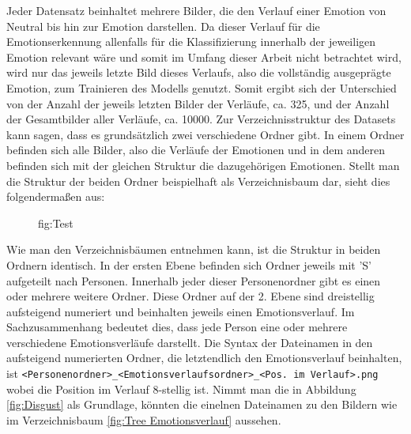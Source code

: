\documentclass[12pt, a4paper]{report}
\begin{document}
Jeder Datensatz beinhaltet mehrere Bilder, die den Verlauf einer Emotion von Neutral bis hin zur Emotion darstellen. Da dieser Verlauf für die Emotionserkennung allenfalls für die Klassifizierung innerhalb der jeweiligen Emotion relevant wäre und somit im Umfang dieser Arbeit nicht betrachtet wird, wird nur das jeweils letzte Bild dieses Verlaufs, also die vollständig ausgeprägte Emotion, zum Trainieren des Modells genutzt. Somit ergibt sich der Unterschied von der Anzahl der jeweils letzten Bilder der Verläufe, ca. 325, und der Anzahl der Gesamtbilder aller Verläufe, ca. 10000.
Zur Verzeichnisstruktur des Datasets kann sagen, dass es grundsätzlich zwei verschiedene Ordner gibt. In einem Ordner befinden sich alle Bilder, also die Verläufe der Emotionen und in dem anderen befinden sich mit der gleichen Struktur die dazugehörigen Emotionen. Stellt man die Struktur der beiden Ordner beispielhaft als Verzeichnisbaum dar, sieht dies folgendermaßen aus:
\setlength{\DTbaselineskip}{20pt}
\DTsetlength{1em}{1.5em}{0.2em}{1pt}{4pt}
\renewcommand*\DTstylecomment{\rmfamily\color{commentgreen}\textsc}
\renewcommand*\DTstyle{\ttfamily\textcolor{red}}
\begin{figure}
\begin{minipage}[b]{.5\linewidth}
\end{minipage}
\begin{minipage}[b]{.5\linewidth}
\end{minipage}
\caption{fig:Test}
\end{figure}
Wie man den Verzeichnisbäumen entnehmen kann, ist die Struktur in beiden Ordnern identisch. In der ersten Ebene befinden sich Ordner jeweils mit 'S' aufgeteilt nach Personen. Innerhalb jeder dieser Personenordner gibt es einen oder mehrere weitere Ordner. Diese Ordner auf der 2. Ebene sind dreistellig aufsteigend numeriert und beinhalten jeweils einen Emotionsverlauf. Im Sachzusammenhang bedeutet dies, dass jede Person eine oder mehrere verschiedene Emotionsverläufe darstellt. Die Syntax der Dateinamen in den aufsteigend numerierten Ordner, die letztendlich den Emotionsverlauf beinhalten, ist \texttt{<Personenordner>\_<Emotionsverlaufsordner>\_<Pos. im Verlauf>.png} wobei die Position im Verlauf 8-stellig ist. Nimmt man die in Abbildung \ref{fig:Disgust} als Grundlage, könnten die einelnen Dateinamen zu den Bildern wie im Verzeichnisbaum \ref{fig:Tree Emotionsverlauf} aussehen.
\end{document}
